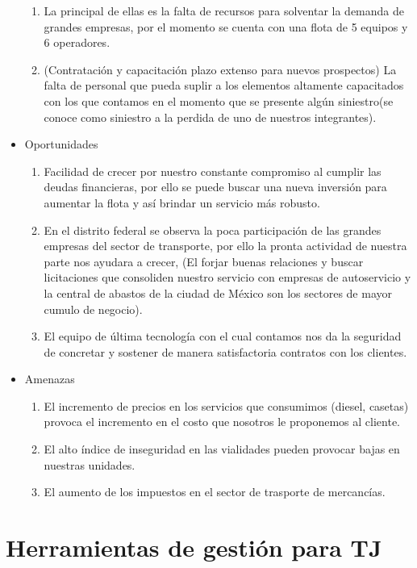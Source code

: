 \begin{itemize}
\begin{enumerate}
			\item La principal de ellas es la falta de recursos para solventar la demanda de grandes empresas, por el momento se cuenta con una 
			flota de 5 equipos y 6 operadores.
			\item (Contratación y capacitación plazo extenso para nuevos prospectos) La falta de personal que pueda suplir a los elementos altamente capacitados con los que contamos en el momento que se 	presente algún siniestro(se conoce como siniestro a la perdida de uno de nuestros integrantes).
		\end{enumerate}
	\item[\itembolasazules{O}] Oportunidades
		\begin{enumerate}
			\item Facilidad de crecer por nuestro constante compromiso al cumplir las deudas financieras, por ello se puede buscar una nueva
			inversión para aumentar la flota y así brindar un servicio más  robusto. 
			\item En el distrito federal se observa la poca participación de las grandes empresas del sector de transporte, por ello la pronta actividad de nuestra parte nos ayudara a crecer, (El forjar buenas relaciones y buscar licitaciones que consoliden nuestro servicio con empresas de autoservicio y la central de abastos de la ciudad de México son los sectores de mayor cumulo de negocio).
			\item El equipo de última tecnología con el cual contamos nos da la seguridad de concretar  y sostener de manera satisfactoria contratos con los clientes.
		\end{enumerate}
	\item[\itembolasazules{A}] Amenazas
		\begin{enumerate}
			\item El incremento de precios en los servicios que consumimos (diesel, casetas) provoca el incremento en el costo que nosotros le proponemos al cliente.
			\item El alto índice de inseguridad en las vialidades pueden provocar bajas en nuestras unidades.
			\item El aumento de los impuestos en el sector de trasporte de mercancías.
		\end{enumerate}	 
\end{itemize}

\section{Herramientas de gestión para TJ}

